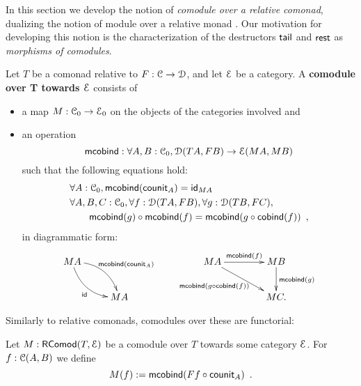 \documentclass[a4paper,USenglish]{lipics}
\newcommand{\parencite}[1]{\cite{#1}}
\newcommand{\fat}[1]{\textbf{#1}}
\newcommand{\itemizedist}{.5em}
\begin{document}
In this section we develop the notion of \emph{comodule over a relative comonad}, dualizing the notion of module over a relative monad \parencite{ahrens_relmonads}.
Our motivation for developing this notion is the characterization of the destructors $\stail$ and $\tail$ as \emph{morphisms of comodules}.

\begin{definition}%
\label{def:comodule}
 Let $T$ be a comonad relative to $F:\C\to\D$, and let $\E$ be a category.
 A \fat{comodule over T towards $\E$} consists of
   \begin{itemize}\setlength{\itemsep}{\itemizedist}
   \item a map $M:\C_0 \to \E_0$ on the objects of the categories involved and
   \item an operation \[\mcobind: \forall A,B:\C_0, \D(TA,FB) \to \E(MA,MB)\] such that the following equations hold:
 \begin{align}
 &  \forall A : \C_0, \mcobind(\counit_A) = \id_{MA} \\
 & \forall A,B,C:\C_0, \forall f : \D(TA,FB),\forall g:\D(TB,FC), \notag\\
 &   \qquad      \comp{\mcobind(f)}{\mcobind(g)} = \mcobind(\comp{\cobind(f)}{g}) \enspace ,
 \end{align}
  in diagrammatic form:
\[
    \begin{xy}
    \xymatrix{
                       MA \ar@/^1pc/[rd]^{\mcobind(\counit_A)} \ar@/_1pc/[rd]_{\id}& \\
                          & MA
    }
   \end{xy}
   \qquad
   \begin{xy}
    \xymatrix@C=4em{
       MA \ar[r]^{\mcobind(f)} \ar[rd]_{\mcobind(\comp{\cobind(f)}{g})\;\;\;\;\;}& MB \ar[d]^{\mcobind(g)} \\
          & MC .
    }
   \end{xy}
\]  
  
  
  \end{itemize}

\end{definition}


Similarly to relative comonads, comodules over these are functorial:
\begin{definition}
\label{def:comodule_lift}
 Let $M : \RComod(T,\E)$ be a comodule over $T$ towards some category $\E$. For $f : \C(A,B)$ we define
  \[ M(f) := \mcobind(\comp{\counit_A}{Ff}) \enspace .  \]
\end{definition}
\end{document}

